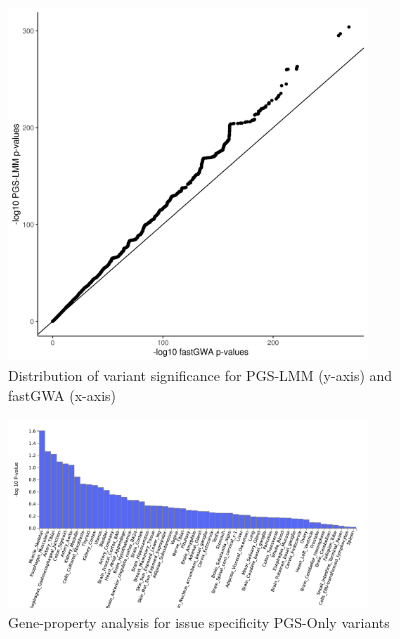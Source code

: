\documentclass{article}
\begin{document}
\begin{figure}[h!]
  \includegraphics[width=0.85\textwidth]{images/SFig1.png}
  \caption{Distribution of variant significance for PGS-LMM (y-axis) and fastGWA (x-axis)}
\end{figure}

\begin{figure}[h!]
  \includegraphics[width=0.85\textwidth]{images/SFig4.png}
  \caption{Gene-property analysis for issue specificity PGS-Only variants}
\end{figure}
\end{document}
